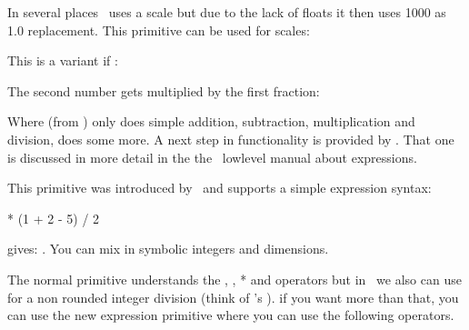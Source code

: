 In several places \TEX\ uses a scale but due to the lack of floats it then uses
1000 as 1.0 replacement. This primitive can be used for  scales:

\startlines \getbuffer \stoplines

\stopnewprimitive

\startnewprimitive[title={\prm {numericscaled}}]

This is a variant if :

\startbuffer
{}
\the{}   \scratchcounter
\the{} \scratchcounter
\the{}  \scratchcounter
\the{}  \scratchcounter
\stopbuffer

\typebuffer

The second number gets multiplied by the first fraction:

\startlines \getbuffer \stoplines

\stopnewprimitive

\startnewprimitive[title={\prm {numexperimental}}]

Where  (from \ETEX) only does simple addition, subtraction,
multiplication and division,  does some more. A next step in
functionality is provided by . That one is discussed in
more detail in the the \CONTEXT\ lowlevel manual about expressions.

\stopnewprimitive

\startoldprimitive[title={\prm {numexpr}}]

This primitive was introduced by \ETEX\ and supports a simple expression syntax:

\startbuffer
\the{} * (1 + 2 - 5) / 2 \relax
\stopbuffer

\typebuffer

gives: \inlinebuffer. You can mix in symbolic integers and dimensions.

\stopoldprimitive

\startnewprimitive[title={\prm {numexpression}}]

The normal  primitive understands the \type {+}, \type {-}, \type
{*} and \type {/} operators but in \LUAMETATEX\ we also can use \type {:} for a
non rounded integer division (think of \LUA's \type {//}). if you want more than
that, you can use the new expression primitive where you can use the following
operators.

